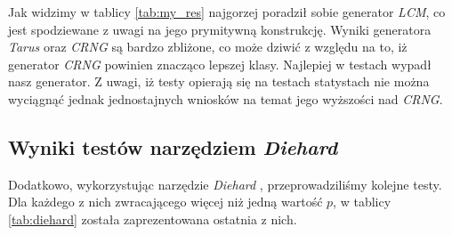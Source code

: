 Jak widzimy w tablicy \ref{tab:my_res} najgorzej poradził sobie generator \emph{LCM}, co jest spodziewane z uwagi na jego prymitywną konstrukcję. Wyniki generatora \emph{Tarus} oraz \emph{CRNG} są bardzo zbliżone, co może dziwić z względu na to, iż generator \emph{CRNG} powinien znacząco lepszej klasy. Najlepiej w testach wypadł nasz generator. Z uwagi, iż testy opierają się na testach statystach nie można wyciągnąć jednak jednostajnych wniosków na temat jego wyższości nad \emph{CRNG}.
\subsection{Wyniki testów narzędziem \textit{Diehard}}
Dodatkowo, wykorzystując narzędzie \emph{Diehard} \cite{Diehard}, przeprowadziliśmy kolejne testy. Dla każdego z nich zwracającego więcej niż jedną wartość $p$, w tablicy \ref{tab:diehard} została zaprezentowana ostatnia z nich.
